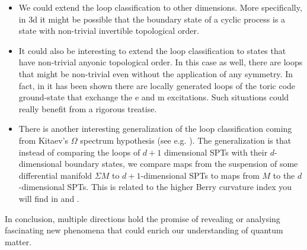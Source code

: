 \begin{itemize}
	\item We could extend the loop classification to other dimensions. More specifically, in 3d it might be possible that the boundary state of a cyclic process is a state with non-trivial invertible topological order.
	\item It could also be interesting to extend the loop classification to states that have non-trivial anyonic topological order. In this case as well, there are loops that might be non-trivial even without the application of any symmetry. In fact, in \cite{Aasen_2022} it has been shown there are locally generated loops of the toric code ground-state that exchange the e and m excitations. Such situations could really benefit from a rigorous treatise.
	\item There is another interesting generalization of the loop classification coming from Kitaev's $\Omega$ spectrum hypothesis (see e.g. \cite{Xiong_2018}). The generalization is that instead of comparing the loops of $d+1$ dimensional SPTs with their $d$-dimensional boundary states, we compare maps from the suspension of some differential manifold $\Sigma M$ to $d+1$-dimensional SPTs to maps from $M$ to the $d$-dimensional SPTs. This is related to the higher Berry curvature index you will find in \cite{Kapustin_2022} and \cite{artymowicz2023quantization}.
\end{itemize}
In conclusion, multiple directions hold the promise of revealing or analysing fascinating new phenomena that could enrich our understanding of quantum matter.
\cleardoublepage

